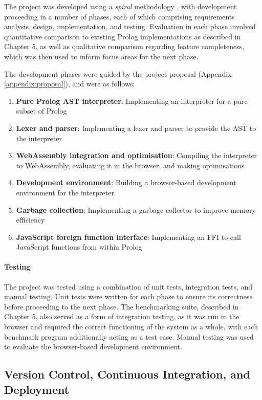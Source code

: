 The project was developed using a \emph{spiral} methodology \cite{boehmspiralmodelsoftware1986}, with development proceeding in a number of phases, each of which comprising requirements analysis, design, implementation, and testing. Evaluation in each phase involved quantitative comparison to existing Prolog implementations as described in Chapter 5, as well as qualitative comparison regarding feature completeness, which was then used to inform focus areas for the next phase.

The development phases were guided by the project proposal (Appendix \ref{appendix:proposal}), and were as follows:

\begin{enumerate}
\item \textbf{Pure Prolog AST interpreter}: Implementing an interpreter for a pure subset of Prolog
\item \textbf{Lexer and parser}: Implementing a lexer and parser to provide the AST to the interpreter
\item \textbf{WebAssembly integration and optimisation}: Compiling the interpreter to WebAssembly, evaluating it in the browser, and making optimisations
\item \textbf{Development environment}: Building a browser-based development environment for the interpreter
\item \textbf{Garbage collection}: Implementing a garbage collector to improve memory efficiency
\item \textbf{JavaScript foreign function interface}: Implementing an FFI to call JavaScript functions from within Prolog
\end{enumerate}

\paragraph{Testing} The project was tested using a combination of unit tests, integration tests, and manual testing. Unit tests were written for each phase to ensure its correctness before proceeding to the next phase. The benchmarking suite, described in Chapter 5, also served as a form of integration testing, as it was run in the browser and required the correct functioning of the system as a whole, with each benchmark program additionally acting as a test case. Manual testing was used to evaluate the browser-based development environment.

\subsection{Version Control, Continuous Integration, and Deployment}

